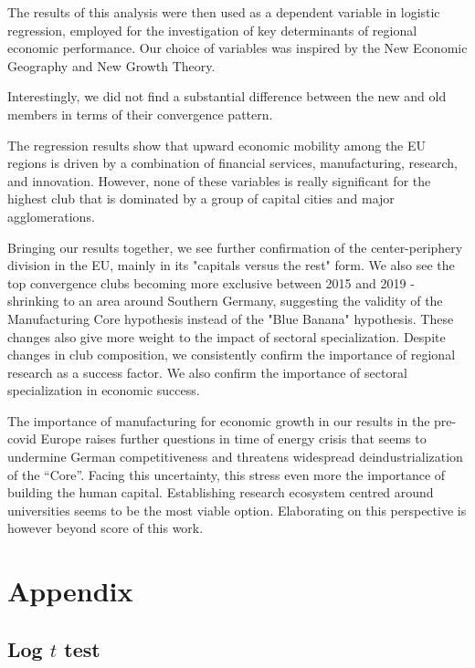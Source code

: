 \documentclass[11pt]{article}
\begin{document}
The results of this analysis were then used as a dependent variable in logistic regression, employed for the investigation of key determinants of regional economic performance. Our choice of variables was inspired by the New Economic Geography and New Growth Theory.


Interestingly, we did not find a substantial difference between the new and old members in terms of their convergence pattern.


The regression results show that upward economic mobility among the EU regions is driven by a combination of financial services, manufacturing, research, and innovation. However, none of these variables is really significant for the highest club that is dominated by a group of capital cities and major agglomerations.
 
 
Bringing our results together, we see further confirmation of the center-periphery division in the EU, mainly in its "capitals versus the rest" form. We also see the top convergence clubs becoming more exclusive between 2015 and 2019 - shrinking to an area around Southern Germany, suggesting the validity of the Manufacturing Core hypothesis instead of the "Blue Banana" hypothesis. These changes also give more weight to the impact of sectoral specialization. Despite changes in club composition, we consistently confirm the importance of regional research as a success factor. We also confirm the importance of sectoral specialization in economic success. 

The importance of manufacturing for economic growth in our results in the pre-covid Europe raises further questions in time of energy crisis that seems to undermine German competitiveness and threatens widespread deindustrialization of the “Core”. Facing this uncertainty, this stress even more the importance of building the human capital. Establishing research ecosystem centred around universities seems to be the most viable option. Elaborating on this perspective is however beyond score of this work.



\newpage



\section{Appendix}

\subsection{Log $t$ test}
\end{document}
